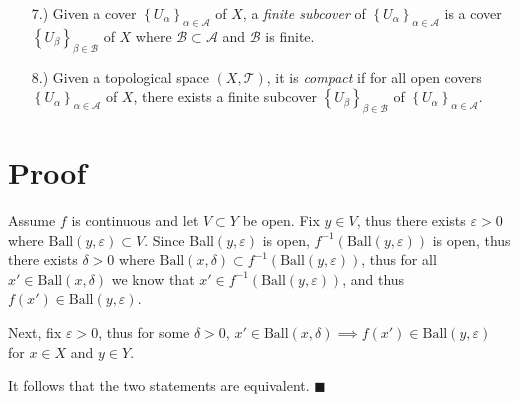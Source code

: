 \documentclass[11pt]{article}
\newcommand{\braces}[1]{\left\{#1\right\}}           %
\newcommand{\e}{\varepsilon}
\begin{document}
\begin{itemize}
    \item [7.)] Given a cover $\braces{U_\alpha}_{\alpha\in\mathcal{A}}$ of $X$, a \textit{finite subcover} of $\braces{U_\alpha}_{\alpha\in\mathcal{A}}$ is a cover $\braces{U_\beta}_{\beta\in\mathcal{B}}$ of $X$ where $\mathcal{B}\subset\mathcal{A}$ and $\mathcal{B}$ is finite.

    \item [8.)] Given a topological space $(X,\mathcal{T})$, it is \textit{compact} if for all open covers $\braces{U_\alpha}_{\alpha\in\mathcal{A}}$ of $X$, there exists a finite subcover $\braces{U_\beta}_{\beta\in\mathcal{B}}$ of $\braces{U_\alpha}_{\alpha\in\mathcal{A}}$.
\end{itemize}

\section*{Proof}
Assume $f$ is continuous and let $V\subset Y$ be open. Fix $y\in V$, thus there exists $\e>0$ where $\text{Ball}(y,\e)\subset V$. Since Ball$(y,\e)$ is open, $f^{-1}(\text{Ball}(y,\e))$ is open, thus there exists $\delta>0$ where $\text{Ball}(x,\delta)\subset f^{-1}(\text{Ball}(y,\e))$, thus for all $x'\in\text{Ball}(x,\delta)$ we know that $x'\in f^{-1}(\text{Ball}(y,\e))$, and thus $f(x')\in\text{Ball}(y,\e)$.

\noindent
Next, fix $\e>0$, thus for some $\delta>0$, $x'\in\text{Ball}(x,\delta)\implies f(x')\in\text{Ball}(y,\e)$ for $x\in X$ and $y\in Y$.

\noindent
It follows that the two statements are equivalent. $\blacksquare$
\end{document}
